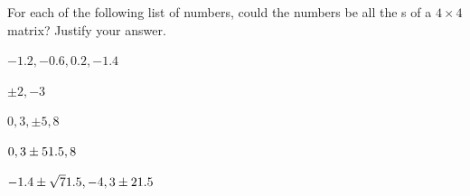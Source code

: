 \sectionExercises





\begin{exercise} \label{ex:} 
For each of the following list of numbers, could the numbers be all the s of a \(4\times4\) matrix? 
Justify your answer.
\begin{parts}
\item \(-1.2,-0.6,0.2,-1.4\)

\item \(\pm2,-3\)

\item \(0,3,\pm5,8\)

\item \(0,3\pm51.5,8\)

\item \(-1.4\pm\sqrt71.5,-4,3\pm21.5\)

\end{parts}
\end{exercise}





